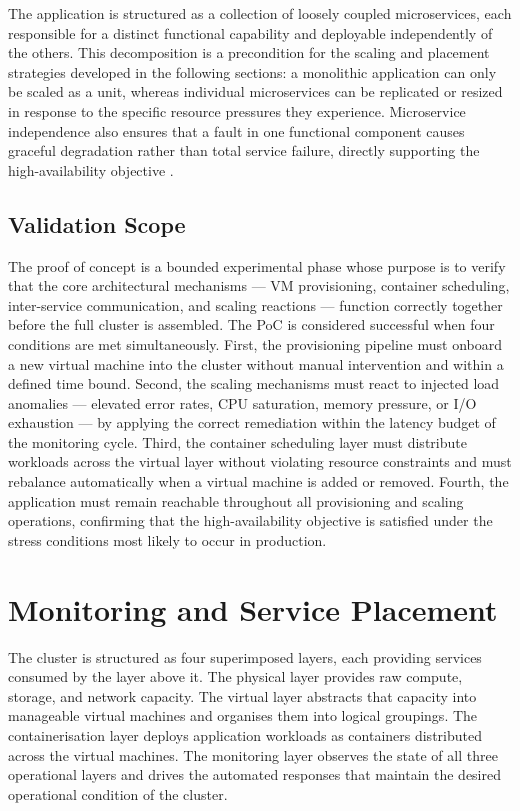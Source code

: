\documentclass[a4paper, 12pt]{report}
\begin{document}
The application is structured as a collection of loosely coupled
microservices, each responsible for a distinct functional capability and
deployable independently of the others.  This decomposition is a
precondition for the scaling and placement strategies developed in the
following sections: a monolithic application can only be scaled as a
unit, whereas individual microservices can be replicated or resized
in response to the specific resource pressures they experience.
Microservice independence also ensures that a fault in one functional
component causes graceful degradation rather than total service failure,
directly supporting the high-availability objective \cite{tanenbaum2017distributed}.
 
\subsection{Validation Scope}
 
The proof of concept is a bounded experimental phase whose purpose is
to verify that the core architectural mechanisms --- VM provisioning,
container scheduling, inter-service communication, and scaling
reactions --- function correctly together before the full cluster is
assembled.  The PoC is considered successful when four conditions are
met simultaneously.  First, the provisioning pipeline must onboard a
new virtual machine into the cluster without manual intervention and
within a defined time bound.  Second, the scaling mechanisms must react
to injected load anomalies --- elevated error rates, CPU saturation,
memory pressure, or I/O exhaustion --- by applying the correct
remediation within the latency budget of the monitoring cycle.  Third,
the container scheduling layer must distribute workloads across the
virtual layer without violating resource constraints and must rebalance
automatically when a virtual machine is added or removed.  Fourth, the
application must remain reachable throughout all provisioning and
scaling operations, confirming that the high-availability objective is
satisfied under the stress conditions most likely to occur in production.
 
\section{Monitoring and Service Placement}
 
The cluster is structured as four superimposed layers, each providing
services consumed by the layer above it.  The physical layer provides
raw compute, storage, and network capacity.  The virtual layer abstracts
that capacity into manageable virtual machines and organises them into
logical groupings.  The containerisation layer deploys application
workloads as containers distributed across the virtual machines.  The
monitoring layer observes the state of all three operational layers and
drives the automated responses that maintain the desired operational
condition of the cluster.
 
\end{document}

